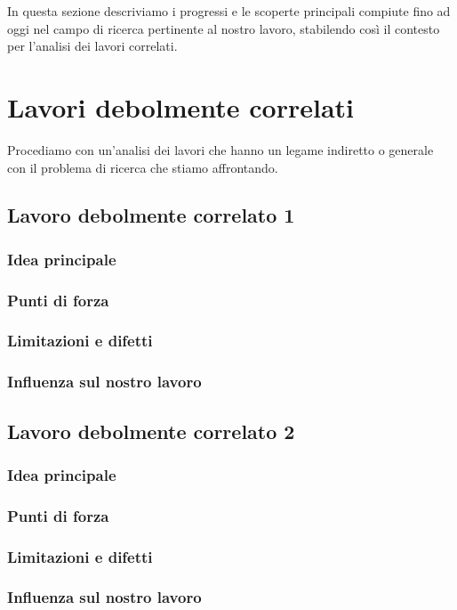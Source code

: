 In questa sezione descriviamo i progressi e le scoperte principali compiute fino ad oggi nel campo di ricerca pertinente al nostro lavoro, stabilendo così il contesto per l'analisi dei lavori correlati.

\section{Lavori debolmente correlati}

Procediamo con un'analisi dei lavori che hanno un legame indiretto o generale con il problema di ricerca che stiamo affrontando.

\subsection{Lavoro debolmente correlato 1}
\subsubsection{Idea principale}
\subsubsection{Punti di forza}
\subsubsection{Limitazioni e difetti}
\subsubsection{Influenza sul nostro lavoro}

\subsection{Lavoro debolmente correlato 2}
\subsubsection{Idea principale}
\subsubsection{Punti di forza}
\subsubsection{Limitazioni e difetti}
\subsubsection{Influenza sul nostro lavoro}

